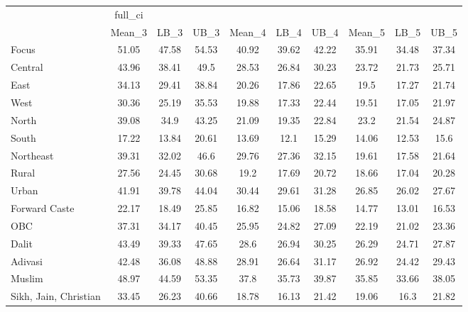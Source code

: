 \begin{tabular}{l*{9}{c}}
\toprule
                    &     full\_ci&            &            &            &            &            &            &            &            \\
                    &      Mean\_3&        LB\_3&        UB\_3&      Mean\_4&        LB\_4&        UB\_4&      Mean\_5&        LB\_5&        UB\_5\\
\midrule
Focus               &       51.05&       47.58&       54.53&       40.92&       39.62&       42.22&       35.91&       34.48&       37.34\\
Central             &       43.96&       38.41&        49.5&       28.53&       26.84&       30.23&       23.72&       21.73&       25.71\\
East                &       34.13&       29.41&       38.84&       20.26&       17.86&       22.65&        19.5&       17.27&       21.74\\
West                &       30.36&       25.19&       35.53&       19.88&       17.33&       22.44&       19.51&       17.05&       21.97\\
North               &       39.08&        34.9&       43.25&       21.09&       19.35&       22.84&        23.2&       21.54&       24.87\\
South               &       17.22&       13.84&       20.61&       13.69&        12.1&       15.29&       14.06&       12.53&        15.6\\
Northeast           &       39.31&       32.02&        46.6&       29.76&       27.36&       32.15&       19.61&       17.58&       21.64\\
Rural               &       27.56&       24.45&       30.68&        19.2&       17.69&       20.72&       18.66&       17.04&       20.28\\
Urban               &       41.91&       39.78&       44.04&       30.44&       29.61&       31.28&       26.85&       26.02&       27.67\\
Forward Caste       &       22.17&       18.49&       25.85&       16.82&       15.06&       18.58&       14.77&       13.01&       16.53\\
OBC                 &       37.31&       34.17&       40.45&       25.95&       24.82&       27.09&       22.19&       21.02&       23.36\\
Dalit               &       43.49&       39.33&       47.65&        28.6&       26.94&       30.25&       26.29&       24.71&       27.87\\
Adivasi             &       42.48&       36.08&       48.88&       28.91&       26.64&       31.17&       26.92&       24.42&       29.43\\
Muslim              &       48.97&       44.59&       53.35&        37.8&       35.73&       39.87&       35.85&       33.66&       38.05\\
Sikh, Jain, Christian&       33.45&       26.23&       40.66&       18.78&       16.13&       21.42&       19.06&        16.3&       21.82\\
\bottomrule
\end{tabular}
